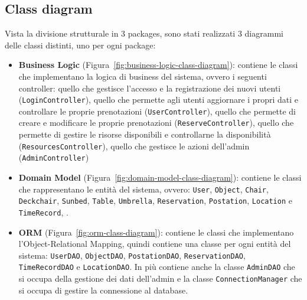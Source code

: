 \documentclass{article}
\begin{document}
\subsection{Class diagram}\label{subsec:class-diagram}
Vista la divisione strutturale in 3 packages, sono stati realizzati 3 diagrammi delle classi distinti, uno per ogni package:
            \begin{itemize}
                \item \textbf{Business Logic} (Figura~\ref{fig:business-logic-class-diagram}): contiene le classi che implementano la logica di business del sistema, ovvero i seguenti controller:
                    quello che gestisce l'accesso e la registrazione dei nuovi utenti (\texttt{LoginController}),
                    quello che permette agli utenti aggiornare i propri dati e controllare le proprie prenotazioni (\texttt{UserController}),
                    quello che permette di creare e modificare le proprie prenotazioni (\texttt{ReserveController}),
                    quello che permette di gestire le risorse disponibili e controllarne la disponibilità (\texttt{ResourcesController}),
                    quello che gestisce le azioni dell'admin  (\texttt{AdminController})
                \item \textbf{Domain Model} (Figura~\ref{fig:domain-model-class-diagram}): contiene le classi che rappresentano le entità del sistema, ovvero:
                    \texttt{User}, \texttt{Object}, \texttt{Chair}, \texttt{Deckchair}, \texttt{Sunbed}, \texttt{Table}, \texttt{Umbrella}, \texttt{Reservation}, \texttt{Postation}, \texttt{Location} e \texttt{TimeRecord}, .
                \item \textbf{ORM} (Figura~\ref{fig:orm-class-diagram}): contiene le classi che implementano l'Object-Relational Mapping, quindi contiene una classe per ogni entità del sistema:
                    \texttt{UserDAO}, \texttt{ObjectDAO}, \texttt{PostationDAO}, \texttt{ReservationDAO}, \texttt{TimeRecordDAO} e \texttt{LocationDAO}.
                    In più contiene anche la classe \texttt{AdminDAO} che si occupa della gestione dei dati dell'admin
                    e la classe \texttt{ConnectionManager} che si occupa di gestire la connessione al database.
            \end{itemize}
\end{document}
